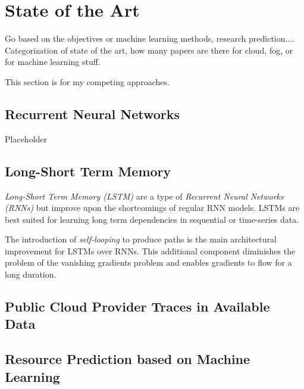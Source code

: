 \chapter{State of the Art}

    Go based on the objectives or machine learning methods, research prediction....
    Categorization of state of the art, how many papers are there for cloud, fog, or for machine learning stuff.

    This section is for my competing approaches.

    \section{Recurrent Neural Networks}
    \label{sec:rnn}

        Placeholder
    \section{Long-Short Term Memory}
    \label{sec:lstm-sota}

        \emph{Long-Short Term Memory (LSTM)} are a type of \emph{Recurrent Neural Networks (RNNs)} but improve upon the shortcomings of regular RNN models.
        LSTMs are best suited for learning long term dependencies in sequential or time-series data.

        The introduction of \emph{self-looping} to produce paths is the main architectural improvement for LSTMs over RNNs. This additional component diminishes the problem of the vanishing gradients problem and enables gradients to flow for a long duration.
        
    \section{Public Cloud Provider Traces in Available Data}
    \section{Resource Prediction based on Machine Learning}
